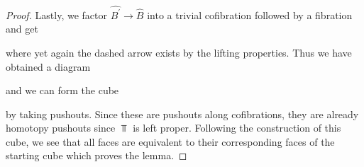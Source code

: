 \begin{lemma}
\begin{proof}
        Lastly, we factor $\widehat{B^{\prime}}\to\widehat{B}$ into a trivial cofibration followed by a fibration and get
        \begin{center}
        \end{center} 
        where yet again the dashed arrow exists by the lifting properties.
        Thus we have obtained a diagram
        \begin{center}
        \end{center}
        and we can form the cube 
        \begin{center}
        \end{center}
        by taking pushouts.
        Since these are pushouts along cofibrations, they are already homotopy pushouts since $\Top$ is left proper.
        Following the construction of this cube, we see that all faces are equivalent to their corresponding faces of the starting cube which proves the lemma.
    \end{proof}
\end{lemma}
